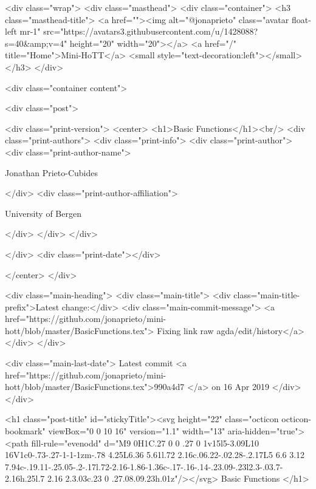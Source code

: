     <div class="wrap">
      <div class="masthead">
        <div class="container">
          <h3 class="masthead-title">
            <a href=""><img alt="@jonaprieto" class="avatar float-left mr-1" src="https://avatars3.githubusercontent.com/u/1428088?s=40&amp;v=4" height="20" width="20"></a>
            <a href="/" title="Home">Mini-HoTT</a>
            <small style="text-decoration:left"></small>
          </h3>
        </div>
      
      <div class="container content">
        







<div class="post">

  <div class="print-version">
    <center>
      <h1>Basic Functions</h1><br/>
        <div class="print-authors">
          <div class="print-info">
            <div class="print-author">
              <div class="print-author-name">
                
                  Jonathan Prieto-Cubides
                
              </div>
              <div class="print-author-affiliation">
                
                  University of Bergen
                
                </div>
            </div>
          </div>
          
          
        </div>
        <div class="print-date"></div>
        
        
    </center>
  </div>

  
  <div class="main-heading">
    <div class="main-title">
      <div class="main-title-prefix">Latest change:</div>
      <div class="main-commit-message">
            <a href="https://github.com/jonaprieto/mini-hott/blob/master/BasicFunctions.tex">
              Fixing link raw agda/edit/history</a>
      </div>
    </div>

    <div class="main-last-date">
      Latest commit <a href="https://github.com/jonaprieto/mini-hott/blob/master/BasicFunctions.tex">990a4d7 </a> on  16 Apr 2019
    </div>
  </div>
  
  <h1 class="post-title" id="stickyTitle"><svg height="22" class="octicon octicon-bookmark" viewBox="0 0 10 16" version="1.1" width="13" aria-hidden="true"><path fill-rule="evenodd" d="M9 0H1C.27 0 0 .27 0 1v15l5-3.09L10 16V1c0-.73-.27-1-1-1zm-.78 4.25L6.36 5.61l.72 2.16c.06.22-.02.28-.2.17L5 6.6 3.12 7.94c-.19.11-.25.05-.2-.17l.72-2.16-1.86-1.36c-.17-.16-.14-.23.09-.23l2.3-.03.7-2.16h.25l.7 2.16 2.3.03c.23 0 .27.08.09.23h.01z"/></svg> Basic Functions
  </h1>

